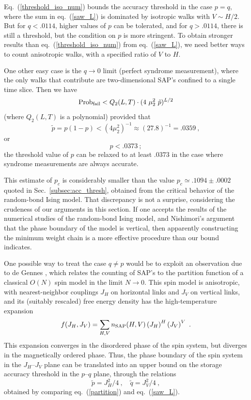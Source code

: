 Eq.~(\ref{threshold_iso_num}) bounds the accuracy threshold in
the case $p=q$, where the sum in eq.~(\ref{saw_L}) is dominated
by isotropic walks with $V\sim H/2$.  But for $q<.0114$, higher values of $p$
can be tolerated, and for $q>.0114$, there is still a threshold, but the
condition on $p$ is more stringent.  To obtain stronger results than
eq.~(\ref{threshold_iso_num}) from eq.~(\ref{saw_L}), we need
better ways to count anisotropic walks, with a specified ratio of $V$ to $H$.

One other easy case is the $q\to 0$ limit (perfect syndrome measurement), where
the only walks that contribute are two-dimensional SAP's confined to a single
time slice. Then we have
\begin{equation}
{\rm Prob}_{\rm fail} < Q_2(L,T)\cdot (4~\mu_2^2 ~\tilde p)^{L/2}
\end{equation}
(where $Q_2(L,T)$ is a polynomial) provided that
\begin{equation}
\tilde p = p(1-p) < (4\mu_2^2)^{-1}\approx (27.8)^{-1}=.0359~,
\end{equation}
or 
\begin{equation}
\label{threshold_iso_2}
p < .0373~;
\end{equation}
the threshold value of $p$ can be relaxed to at least $.0373$ in the case where
syndrome measurements are always accurate. 

This estimate of $p_c$ is considerably smaller than the value $p_c\simeq .1094 \pm .0002$ quoted in Sec.~\ref{subsec:acc_thresh}, obtained from the critical behavior of the random-bond Ising model. That discrepancy is not a surprise, considering the crudeness of our arguments in this section. If one accepts the results of the numerical studies of the random-bond Ising model, and Nishimori's argument that the phase boundary of the model is vertical, then apparently constructing the minimum weight chain is a more effective procedure than our bound indicates.

One possible way to treat the case $q\ne p$ would be to exploit an
observation due to de Gennes \cite{degennes}, which relates the counting of
SAP's to the partition function of a classical $O(N)$ spin model in the limit
$N\to 0$. This spin model is anisotropic, with nearest-neighbor couplings $J_H$
on horizontal links and $J_V$ on vertical links, and its (suitably rescaled) free energy density has the high-temperature expansion
\begin{equation}
\label{partition}
f(J_H,J_V)=\sum_{H,V} n_{\rm SAP}(H,V) \left(J_H\right)^H\left(J_V\right)^V~.
\end{equation}
This expansion converges in the disordered phase of the spin system, but
diverges in the magnetically ordered phase.  Thus, the phase boundary of the
spin system in the $J_H$--$J_V$ plane can be translated into an upper bound on
the storage accuracy threshold in the $p$--$q$ plane, through the relations
\begin{equation}
\tilde p=J^2_H/4~,\quad \tilde q=J^2_V/4~,
\end{equation}
obtained by comparing eq.~(\ref{partition}) and eq.~(\ref{saw_L}).

